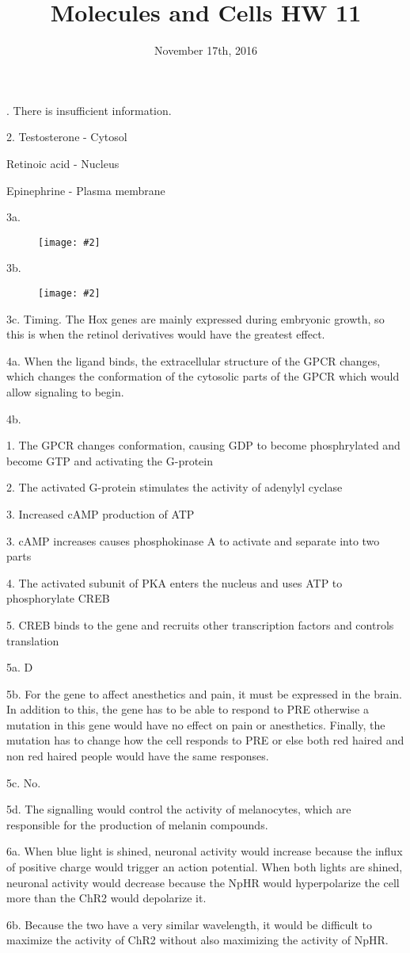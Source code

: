 \documentclass{article}
\title{Molecules and Cells HW 11}
\date{November 17th, 2016}
\newcommand{\makefig}[2]{
\begin{figure}[h]
\centering
\texttt{[image: \#2]}
\end{figure}
}
\begin{document}
. There is insufficient information.

2.
Testosterone - Cytosol

Retinoic acid - Nucleus

Epinephrine - Plasma membrane

3a. \makefig{0.5}{3a.png}

3b. \makefig{0.5}{3b.png}

3c. Timing. The Hox genes are mainly expressed during embryonic growth, so this is when the retinol derivatives would have the greatest effect.

4a. When the ligand binds, the extracellular structure of the GPCR changes, which changes the conformation of the cytosolic parts of the GPCR which would allow signaling to begin.

4b.

1. The GPCR changes conformation, causing GDP to become phosphrylated and become GTP and activating the G-protein

2. The activated G-protein stimulates the activity of adenylyl cyclase

3. Increased cAMP production of ATP

3. cAMP increases causes phosphokinase A to activate and separate into two parts

4. The activated subunit of PKA enters the nucleus and uses ATP to phosphorylate CREB

5. CREB binds to the gene and  recruits other transcription factors and controls translation

\vspace{5mm}

5a. D

5b. For the gene to affect anesthetics and pain, it must be expressed in the  brain. In addition to this, the gene has to be able to respond to PRE otherwise a mutation in this gene would have no effect on pain or anesthetics. Finally, the mutation has to change how the cell responds to PRE or else both red haired and non red haired people would have the same responses.

5c. No.

5d. The signalling would control the activity of melanocytes, which are responsible for the production of melanin compounds.

6a. When blue light is shined, neuronal activity would increase because the influx of positive charge would trigger an action potential. When both lights are shined, neuronal activity would decrease because the NpHR would hyperpolarize the cell more than the ChR2 would depolarize it.

6b. Because the two have a very similar wavelength, it would be difficult to maximize the activity of ChR2 without also maximizing the activity of NpHR.
\end{document}
